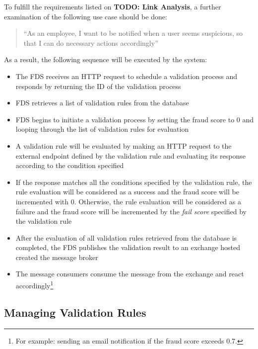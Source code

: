 To fulfill the requirements listed on \textbf{TODO: Link Analysis}, a further examination of the following use case should be done:

\begin{quotation}
 \enquote{As an employee, I want to be notified when a user seems suspicious, so that I can do necessary actions accordingly} 
\end{quotation}

As a result, the following sequence will be executed by the system:

\begin{itemize}
 \item The FDS receives an HTTP request to schedule a validation process and responds by returning the ID of the validation process
 \item FDS retrieves a list of validation rules from the database
 \item FDS begins to initiate a validation process by setting the fraud score to 0 and looping through the list of validation rules for evaluation
 \item A validation rule will be evaluated by making an HTTP request to the external endpoint defined by the validation rule and evaluating its response according to the condition specified
 \item If the response matches all the conditions specified by the validation rule, the rule evaluation will be considered as a success and the fraud score will be incremented with 0. Otherwise, the rule evaluation will be considered as a failure and the fraud score will be incremented by the \emph{fail score} specified by the validation rule
 \item After the evaluation of all validation rules retrieved from the database is completed, the FDS publishes the validation result to an exchange hosted created the message broker
 \item The message consumers consume the message from the exchange and react accordingly\footnote{For example: sending an email notification if the fraud score exceeds 0.7.}
\end{itemize}

\subsection{Managing Validation Rules}

